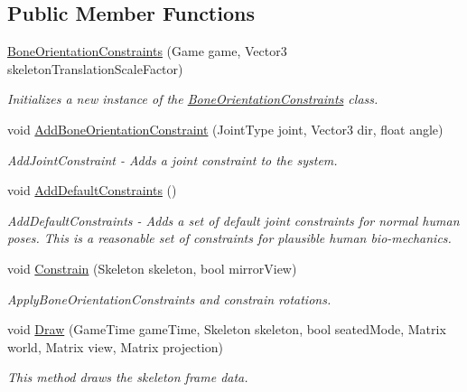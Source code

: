 \subsection*{Public Member Functions}
\begin{DoxyCompactItemize}
\item 
\hyperlink{class_microsoft_1_1_samples_1_1_kinect_1_1_avateering_1_1_filters_1_1_bone_orientation_constraints_a465df7ac1591095215188b055402e904}{Bone\+Orientation\+Constraints} (Game game, Vector3 skeleton\+Translation\+Scale\+Factor)
\begin{DoxyCompactList}\small\item\em Initializes a new instance of the \hyperlink{class_microsoft_1_1_samples_1_1_kinect_1_1_avateering_1_1_filters_1_1_bone_orientation_constraints}{Bone\+Orientation\+Constraints} class. \end{DoxyCompactList}\item 
void \hyperlink{class_microsoft_1_1_samples_1_1_kinect_1_1_avateering_1_1_filters_1_1_bone_orientation_constraints_aa7de250ad471493e2c5122be569332bf}{Add\+Bone\+Orientation\+Constraint} (Joint\+Type joint, Vector3 dir, float angle)
\begin{DoxyCompactList}\small\item\em Add\+Joint\+Constraint -\/ Adds a joint constraint to the system. \end{DoxyCompactList}\item 
void \hyperlink{class_microsoft_1_1_samples_1_1_kinect_1_1_avateering_1_1_filters_1_1_bone_orientation_constraints_a765f01d12d283f765257f34ef606b812}{Add\+Default\+Constraints} ()
\begin{DoxyCompactList}\small\item\em Add\+Default\+Constraints -\/ Adds a set of default joint constraints for normal human poses. This is a reasonable set of constraints for plausible human bio-\/mechanics. \end{DoxyCompactList}\item 
void \hyperlink{class_microsoft_1_1_samples_1_1_kinect_1_1_avateering_1_1_filters_1_1_bone_orientation_constraints_ac5ad273f2b1ee5a6fafef733290ce114}{Constrain} (Skeleton skeleton, bool mirror\+View)
\begin{DoxyCompactList}\small\item\em Apply\+Bone\+Orientation\+Constraints and constrain rotations. \end{DoxyCompactList}\item 
void \hyperlink{class_microsoft_1_1_samples_1_1_kinect_1_1_avateering_1_1_filters_1_1_bone_orientation_constraints_aecf019a3f152a6b4cdfb6d4f12e6c08c}{Draw} (Game\+Time game\+Time, Skeleton skeleton, bool seated\+Mode, Matrix world, Matrix view, Matrix projection)
\begin{DoxyCompactList}\small\item\em This method draws the skeleton frame data. \end{DoxyCompactList}\end{DoxyCompactItemize}
